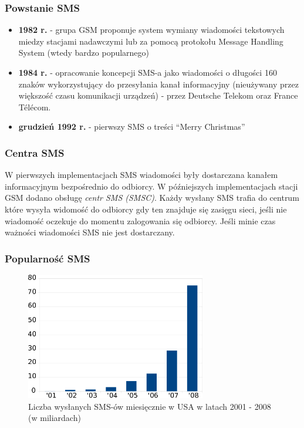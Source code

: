 \documentclass[xcolor=table]{beamer}
\begin{document}
\begin{frame}
  \frametitle{Powstanie SMS}

  \begin{itemize}
    \item \textbf{1982 r.} - grupa GSM proponuje system wymiany wiadomości
      tekstowych miedzy stacjami nadawczymi lub za pomocą protokołu Message
      Handling System (wtedy bardzo popularnego)
    \item \textbf{1984 r.} - opracowanie koncepcji SMS-a jako wiadomości o
      długości 160 znaków wykorzystujący do przesyłania kanał informacyjny
      (nieużywany przez większość czasu komunikacji urządzeń) - przez Deutsche
      Telekom oraz France Télécom.
    \item \textbf{grudzień 1992 r.} - pierwszy SMS o treści ``Merry
      Christmas''
  \end{itemize}
\end{frame}

\begin{frame}
  \frametitle{Centra SMS}

  W pierwszych implementacjach SMS wiadomości były dostarczana kanałem
  informacyjnym bezpośrednio do odbiorcy. W późniejszych implementacjach stacji
  GSM dodano obsługę \emph{centr SMS (SMSC)}. Każdy wysłany SMS trafia do
  centrum które wysyła widomość do odbiorcy gdy ten znajduje się zasięgu sieci,
  jeśli nie wiadomość oczekuje do momentu zalogowania się odbiorcy. Jeśli minie
  czas ważności wiadomości SMS nie jest dostarczany.
\end{frame}

\begin{frame}
  \frametitle{Popularność SMS}

  \begin{center}
    \begin{figure}
      \includegraphics[width=0.7\textwidth]{sms_sent_monthly}
      \caption{Liczba wysłanych SMS-ów miesięcznie w USA w latach 2001 - 2008
      (w miliardach)}
    \end{figure}
  \end{center}
\end{frame}
\end{document}
